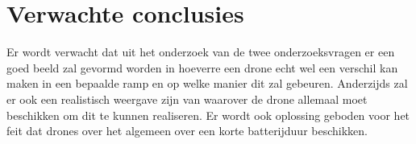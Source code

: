 \section{Verwachte conclusies}
\label{sec:verwachte_conclusies}

Er wordt verwacht dat uit het onderzoek van de twee onderzoeksvragen er een goed beeld zal gevormd worden in hoeverre een drone echt wel een verschil kan maken in een bepaalde ramp en op welke manier dit zal gebeuren. Anderzijds zal er ook een realistisch weergave zijn van waarover de drone allemaal moet beschikken om dit te kunnen realiseren. Er wordt ook oplossing geboden voor het feit dat drones over het algemeen over een korte batterijduur beschikken.

